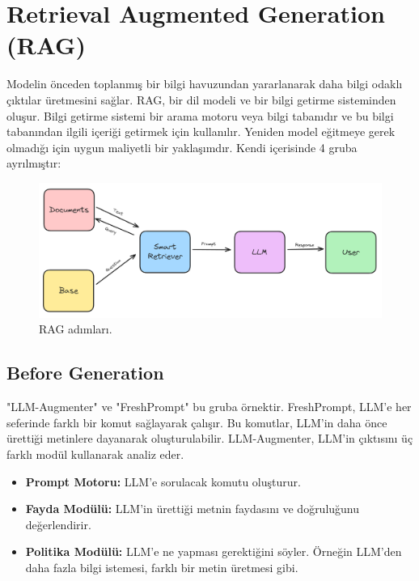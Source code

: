 \section{Retrieval Augmented Generation (RAG)}
Modelin önceden toplanmış bir bilgi havuzundan yararlanarak daha bilgi odaklı çıktılar üretmesini sağlar. RAG, bir dil modeli ve bir bilgi getirme sisteminden oluşur. Bilgi getirme sistemi bir arama motoru veya bilgi tabanıdır ve bu bilgi tabanından ilgili içeriği getirmek için kullanılır. Yeniden model eğitmeye gerek olmadığı için uygun maliyetli bir yaklaşımdır. Kendi içerisinde 4 gruba ayrılmıştır:

\begin{figure}[h]
    \centering
    \includegraphics[width=1\textwidth]{images/rag_architecture.png}
    \caption{RAG adımları.}
    \label{fig:enter-label}
\end{figure}

\subsection{Before Generation}
"LLM-Augmenter" ve "FreshPrompt" bu gruba örnektir. FreshPrompt, LLM'e her seferinde farklı bir komut sağlayarak çalışır. Bu komutlar, LLM'in daha önce ürettiği metinlere dayanarak oluşturulabilir. LLM-Augmenter, LLM'in çıktısını üç farklı modül kullanarak analiz eder.
\begin{itemize}
    \item \textbf{Prompt Motoru:} LLM'e sorulacak komutu oluşturur.
    \item \textbf{Fayda Modülü:} LLM'in ürettiği metnin faydasını ve doğruluğunu değerlendirir.
    \item \textbf{Politika Modülü:} LLM'e ne yapması gerektiğini söyler. Örneğin LLM'den daha fazla bilgi istemesi, farklı bir metin üretmesi gibi.
\end{itemize}

